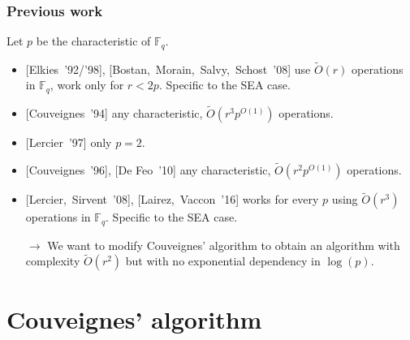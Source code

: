 \documentclass[10pt,a4paper]{beamer}
\theoremstyle{plain}
\theoremstyle{definition}
\theoremstyle{definition}
\theoremstyle{definition}
\theoremstyle{definition}
\theoremstyle{remark}
\theoremstyle{remark}
\begin{document}

\begin{frame}
\frametitle{Previous work}

Let $p$ be the characteristic of $\mathbb{F}_q$.

\begin{itemize}
\item{} [Elkies~'92/'98],  %
[Bostan,~Morain,~Salvy,~Schost~'08] use $\tilde{O}(r)$ operations in $\mathbb{F}_q$, work only for $r < 2p$. Specific to the SEA case.
\item{} [Couveignes~'94] any characteristic, $\tilde{O}(r^3
p^{O(1)})$ operations.
\item{} [Lercier~'97] only $p=2$.
\item{} [Couveignes~'96], [De Feo~'10] any characteristic, $\tilde{O}(r^2
p^{O(1)})$ operations.
\item{} [Lercier,~Sirvent~'08], [Lairez,~Vaccon~'16] works for every $p$ using $\tilde{O}(r^3)$ operations in $\mathbb{F}_q$. Specific to the SEA case.
\end{itemize}
\begin{itemize}


\item[$\rightarrow$] We want to modify Couveignes' algorithm to obtain an algorithm with complexity $\tilde{O}(r^2)$ but with no exponential dependency in $\log(p)$.

\end{itemize}
\end{frame}


\section{Couveignes' algorithm}
\end{document}
